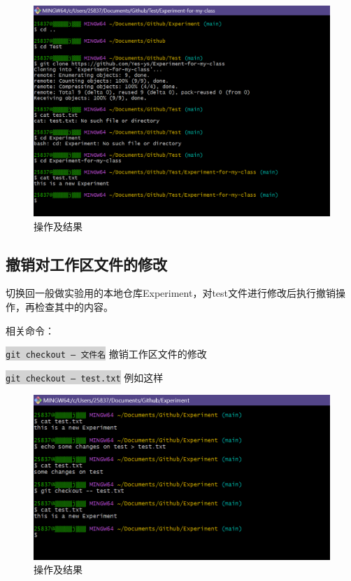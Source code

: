 \documentclass[a4paper, 12pt]{article}
\begin{document}
\begin{figure}[h!]
  \centering
  \includegraphics[width=1\textwidth]{im11}
  \caption{操作及结果}
  \label{image-myimage}
\end{figure}

\clearpage

  \subsection{撤销对工作区文件的修改}

切换回一般做实验用的本地仓库Experiment，对test文件进行修改后执行撤销操作，再检查其中的内容。

相关命令：

\colorbox{lightgray}{\texttt{git checkout -- 文件名}} 撤销工作区文件的修改

\colorbox{lightgray}{\texttt{git checkout -- test.txt}}  例如这样

\begin{figure}[h!]
  \centering
  \includegraphics[width=1\textwidth]{im12}
  \caption{操作及结果}
  \label{image-myimage}
\end{figure}
\end{document}
